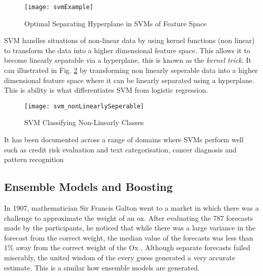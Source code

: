 \begin{figure}[H]
	\texttt{[image: svmExample]}
	\caption{Optimal Separating Hyperplane in SVMs of Feature Space \\
		\cite[Source:][]{li_adaptive_2011}
	}
	\label{fig:svmExample}
\end{figure}

SVM handles situations of non-linear data by using kernel functions (non linear) to transform the data into a higher dimensional feature space. This allows it to become linearly separable via a hyperplane, this is known as the \textit{kernel trick}. It can illustrated in Fig. \ref{fig:svm_nonLinearlySeperable} by transforming non linearly seperable data into a higher dimensional feature space where it can be linearly separated using a hyperplane. This is ability is what differentiates SVM from logistic regression.

\begin{figure}[H]
	\texttt{[image: svm\_nonLinearlySeperable]}
	\caption{SVM Classifying Non-Linearly Classes \\
		\cite[Source:][]{burges_tutorial_1998}
	}
	\label{fig:svm_nonLinearlySeperable}
\end{figure}

It has been documented across a range of domains where SVMs perform well such as credit risk evaluation \citep{van_gestel_credit_2009} and text categorisation, cancer diagnosis and pattern recognition \citep{shin_application_2005}

\subsection{Ensemble Models and Boosting} \label{boosting}

In 1907, mathematician Sir Francis Galton went to a market in which there was a challenge
to approximate the weight of an ox. After evaluating the 787 forecasts made by the
participants, he noticed that while there was a large variance in the forecast from the correct weight, the median value of the
forecasts was less than 1\% away from the correct weight of the Ox \citep{galton_vox_1907}. Although separate forecasts failed miserably, the united wisdom of the every guess generated a very accurate estimate. This is a similar how ensemble models are generated.


